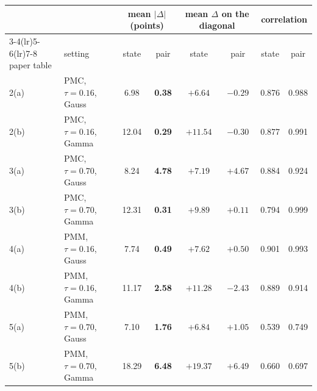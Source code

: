 \begin{tabular}{llcccccc}
\toprule
 & & \multicolumn{2}{c}{mean $|\Delta|$ (points)} & \multicolumn{2}{c}{mean $\Delta$ on the diagonal} & \multicolumn{2}{c}{correlation} \\
\cmidrule(lr){3-4}\cmidrule(lr){5-6}\cmidrule(lr){7-8}
paper table & setting & state & pair & state & pair & state & pair \\
\midrule
2(a) & PMC, $\tau=0.16$, Gauss & 6.98 & \textbf{0.38} & $+6.64$ & $-0.29$ & 0.876 & 0.988 \\
2(b) & PMC, $\tau=0.16$, Gamma & 12.04 & \textbf{0.29} & $+11.54$ & $-0.30$ & 0.877 & 0.991 \\
3(a) & PMC, $\tau=0.70$, Gauss & 8.24 & \textbf{4.78} & $+7.19$ & $+4.67$ & 0.884 & 0.924 \\
3(b) & PMC, $\tau=0.70$, Gamma & 12.31 & \textbf{0.31} & $+9.89$ & $+0.11$ & 0.794 & 0.999 \\
\midrule
4(a) & PMM, $\tau=0.16$, Gauss & 7.74 & \textbf{0.49} & $+7.62$ & $+0.50$ & 0.901 & 0.993 \\
4(b) & PMM, $\tau=0.16$, Gamma & 11.17 & \textbf{2.58} & $+11.28$ & $-2.43$ & 0.889 & 0.914 \\
5(a) & PMM, $\tau=0.70$, Gauss & 7.10 & \textbf{1.76} & $+6.84$ & $+1.05$ & 0.539 & 0.749 \\
5(b) & PMM, $\tau=0.70$, Gamma & 18.29 & \textbf{6.48} & $+19.37$ & $+6.49$ & 0.660 & 0.697 \\
\bottomrule
\end{tabular}
